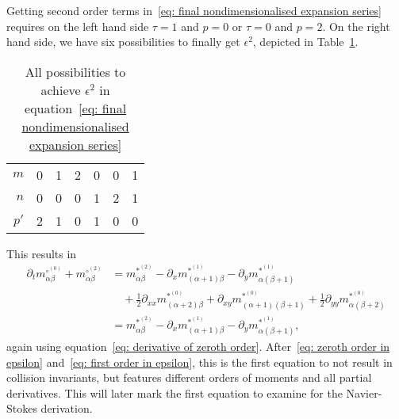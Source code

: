 Getting second order terms in~\eqref{eq: final nondimensionalised expansion series} requires on the left hand side $\tau=1$ and $p=0$ or $\tau=0$ and $p=2$.
On the right hand side, we have six possibilities to finally get $\epsilon^2$, depicted in Table~\ref{table: second order epsilon}.
\begin{table}[h]
  \centering
  \begin{tabular} {r || c | *{2}{c} | *{2}{c} | c}
    $m$  & 0 & 1 & 2 & 0 & 0 & 1 \\
    $n$  & 0 & 0 & 0 & 1 & 2 & 1 \\
    $p'$ & 2 & 1 & 0 & 1 & 0 & 0
  \end{tabular}
  \caption{All possibilities to achieve $\epsilon^2$ in equation~\eqref{eq: final nondimensionalised expansion series}}
\label{table: second order epsilon}
\end{table}
This results in
\begin{equation}
  \label{eq: second order in epsilon}
  \begin{aligned}
    \partial_t m_{\alpha\beta}^{\circ^{(0)}} + m_{\alpha\beta}^{\circ^{(2)}}
    & =  m_{\alpha\beta}^{*^{(2)}}
     - \partial_x m_{(\alpha+1)\beta}^{*^{(1)}}
     - \partial_y m_{\alpha(\beta+1)}^{*^{(1)}}
     \\ &\quad
     + \frac{1}{2}\partial_{xx} m_{(\alpha+2)\beta}^{*^{(0)}}
     + \partial_{xy} m_{(\alpha+1)(\beta+1)}^{*^{(0)}}
     + \frac{1}{2}\partial_{yy} m_{\alpha(\beta+2)}^{*^{(0)}}
     \\
    & =  m_{\alpha\beta}^{*^{(2)}} - \partial_x m_{(\alpha+1)\beta}^{*^{(1)}} - \partial_y m_{\alpha(\beta+1)}^{*^{(1)}},
  \end{aligned}
\end{equation}
again using equation~\eqref{eq: derivative of zeroth order}.
After~\eqref{eq: zeroth order in epsilon} and~\eqref{eq: first order in epsilon}, this is the first equation to not result in collision invariants, but features different orders of moments and all partial derivatives.
This will later mark the first equation to examine for the Navier-Stokes derivation.

